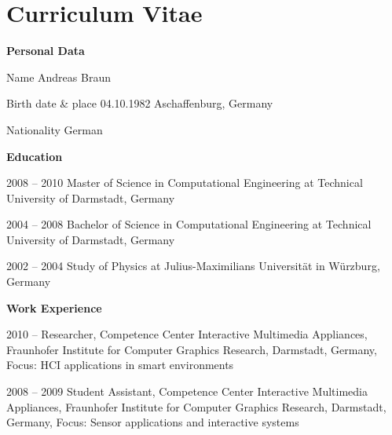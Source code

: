 \chapter{Curriculum Vitae }

\begin{cv}{}
  \begin{cvlist}{\textbf{Personal Data}}
  \item[Name] Andreas Braun
  \item[Birth date \& place] 04.10.1982 Aschaffenburg, Germany
	\item[Nationality] German
\end{cvlist}

\vspace{1cm}

\begin{cvlist}{\textbf{Education}} 
\item[2008 -- 2010] Master of Science in Computational Engineering at Technical University of Darmstadt, Germany
\item[2004 -- 2008] Bachelor of Science in Computational Engineering at Technical University of Darmstadt, Germany
\item[2002 -- 2004] Study of Physics at Julius-Maximilians Universität in Würzburg, Germany
\end{cvlist}

\vspace{1cm}

\begin{cvlist}{\textbf{Work Experience}}
\item[2010 --] Researcher, Competence Center Interactive Multimedia Appliances, Fraunhofer Institute for Computer Graphics Research, Darmstadt, Germany, Focus: HCI applications in smart environments
\item[2008 -- 2009] Student Assistant, Competence Center Interactive Multimedia Appliances, Fraunhofer Institute for Computer Graphics Research, Darmstadt, Germany, Focus: Sensor applications and interactive systems
\end{cvlist}

\date{}
\end{cv}






